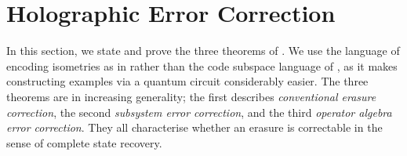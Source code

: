 \documentclass[12pt,a4paper]{report}
\numberwithin{equation}{section}
\theoremstyle{definition}
\theoremstyle{theorem}
\theoremstyle{theorem}
\theoremstyle{example}
\theoremstyle{definition}
\begin{document}

\chapter{Holographic Error Correction}
In this section, we state and prove the three theorems of \cite{Harlow}. We use the language of encoding isometries as in \cite{Pollack} rather than the code subspace language of \cite{Harlow}, as it makes constructing examples via a quantum circuit considerably easier. The three theorems are in increasing generality; the first describes \textit{conventional erasure correction}, the second \textit{subsystem error correction}, and the third \textit{operator algebra error correction}. They all characterise whether an erasure is correctable in the sense of complete state recovery.
\end{document}
